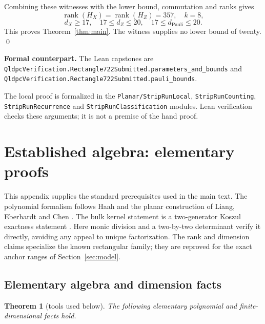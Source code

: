 \documentclass{article}
\newtheorem{theorem}{Theorem}
\DeclareMathOperator{\rank}{rank}
\begin{document}
Combining these witnesses with the lower bound, commutation and ranks gives
\begin{equation}
  \rank(H_X) = \rank(H_Z) = 357, \quad k = 8,
\end{equation}
\begin{equation}
  d_X \ge 17, \quad 17 \le d_Z \le 20, \quad 17 \le d_{\mathrm{Pauli}} \le 20.
\end{equation}
This proves Theorem~\ref{thm:main}. The witness supplies no lower bound of twenty. \qed

\begin{sloppypar}
\textbf{Formal counterpart.} The Lean capstones are
\nolinkurl{QldpcVerification.Rectangle722Submitted.parameters_and_bounds} and
\nolinkurl{QldpcVerification.Rectangle722Submitted.pauli_bounds}.

The local proof is formalized in the \nolinkurl{Planar/StripRunLocal},
\texttt{StripRunCounting}, \texttt{StripRunRecurrence} and \texttt{StripRunClassification}
modules. Lean verification checks these arguments; it is not a premise
of the hand proof.
\end{sloppypar}

\appendix
{}
\renewcommand{\thetheorem}{\thesection.\arabic{theorem}}

\section{Established algebra: elementary proofs}\label{app:algebra}

This appendix supplies the standard prerequisites used in the main text.
The polynomial formalism follows Haah \cite{haah2013} and the planar construction
of Liang, Eberhardt and Chen \cite[Appendix~A and Section~II]{liang2025}. The
bulk kernel statement is a two-generator Koszul exactness statement
\cite[Sections~4.1--4.2]{tile2025}. Here monic division and a two-by-two determinant
verify it directly, avoiding any appeal to unique factorization. The
rank and dimension claims specialize the known rectangular family; they
are reproved for the exact anchor ranges of Section~\ref{sec:model}.

\subsection{Elementary algebra and dimension facts}\label{app:elementary}

\begin{theorem}[tools used below]\label{thm:elementary}
  The following elementary polynomial and finite-dimensional facts hold.
\end{theorem}
\end{document}
